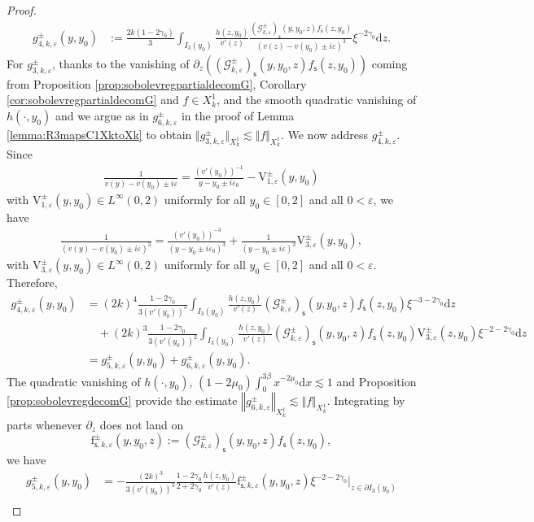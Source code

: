\documentclass[11pt,reqno]{amsproc}
\theoremstyle{definition}
\numberwithin{equation}{section}
\newcommand{\G}{{\mathcal{G}}}
\newcommand{\s}{{\mathsf{s}}}
\renewcommand{\d}{\mathrm{d}}
\newcommand{\ep}{\varepsilon}
\begin{document}
\begin{proof}
\begin{align*}
g_{4,k,\ep}^\pm(y,y_0) &:= \frac{2k(1-2\gamma_0)}{3}\int_{I_3(y_0)} \frac{h(z,y_0)}{v'(z)}  \frac{\left(\G_{k,\ep}^\pm\right)_\s(y,y_0,z)f_\s(z,y_0)}{(v(z) - v(y_0) \pm i\ep)^3}\xi^{-2\gamma_0} \d z.
\end{align*}
For $g_{3,k,\ep}^\pm$, thanks to the vanishing of $\partial_z \left( \left(\G_{k,\ep}^\pm\right)_\s(y,y_0,z)f_\s(z,y_0)\right)$ coming from Proposition \ref{prop:sobolevregpartialdecomG}, Corollary \ref{cor:sobolevregpartialdecomG} and $f\in X_k^1$, and the smooth quadratic vanishing of $h(\cdot,y_0)$ and  we argue as in $g_{6,k,\ep}^\pm$ in the proof of Lemma \ref{lemma:R3mapsC1XktoXk} to obtain $\Vert g_{3,k,\ep}^\pm \Vert_{X_k^1}\lesssim \Vert f \Vert_{X_k^1}$. We now address $g_{4,k,\ep}^\pm$. Since 
\begin{align*}
\frac{1}{v(y) - v(y_0) \pm i\ep} = \frac{(v'(y_0))^{-1}}{y-y_0\pm i\ep_0} -\mathrm{V}_{1,\ep}^\pm(y,y_0)
\end{align*}
with $\mathrm{V}_{1,\ep}^\pm(y,y_0)\in L^\infty(0,2)$ uniformly for all $y_0\in [0,2]$ and all $0<\ep$, we have
\begin{align*}
\frac{1}{(v(y) - v(y_0) \pm i\ep)^3} = \frac{(v'(y_0))^{-3}}{(y-y_0\pm i\ep_0)^3} + \frac{1}{(y-y_0\pm i\ep)^2}\mathrm{V}_{3,\ep}^\pm(y,y_0),
\end{align*}
with $\mathrm{V}_{3,\ep}^\pm(y,y_0)\in L^\infty(0,2)$ uniformly for all $y_0\in [0,2]$ and all $0<\ep$. Therefore,
\begin{align*}
g_{4,k,\ep}^\pm(y,y_0) &= (2k)^4\frac{1-2\gamma_0}{3(v'(y_0))^3}\int_{I_3(y_0)}\frac{h(z,y_0)}{v'(z)} \left(\G_{k,\ep}^\pm\right)_\s(y,y_0,z)f_\s(z,y_0) \xi^{-3-2\gamma_0} \d z \\
&\quad + (2k)^3\frac{1-2\gamma_0}{3(v'(y_0))^2} \int_{I_3(y_0)} \frac{h(z,y_0)}{v'(z)} \left(\G_{k,\ep}^\pm\right)_\s(y,y_0,z)f_\s(z,y_0)\mathrm{V}_{3,\ep}^\pm(z,y_0) \xi^{-2-2\gamma_0} \d z \\
&= g_{5,k,\ep}^\pm(y,y_0) + g_{6,k,\ep}^\pm(y,y_0).
\end{align*}
The quadratic vanishing of $h(\cdot, y_0)$,  $(1-2\mu_0)\int_0^{3\beta}x^{-2\mu_0}\d x \lesssim 1$ and Proposition \ref{prop:sobolevregdecomG} provide the estimate $\left \Vert g_{6,k,\ep}^\pm \right\Vert_{X_k^1}\lesssim \Vert f \Vert_{X_k^1}$. Integrating by parts whenever $\partial_z$ does not land on 
$$\mathrm{f}_{\s,k,\ep}^\pm(y,y_0,z):= \left(\G_{k,\ep}^\pm\right)_\s(y,y_0,z)f_\s(z,y_0),$$ 
we have
\begin{align*}
g_{5,k,\ep}^\pm(y,y_0) &= - \frac{(2k)^3}{3(v'(y_0))^3}\frac{1-2\gamma_0}{2+2\gamma_0} \frac{h(z,y_0)}{v'(z)} \mathrm{f}_{\s,k,\ep}^\pm(y,y_0,z) \xi^{-2-2\gamma_0} \Big|_{z\in \partial I_3(y_0)} \\

\end{align*}
\end{proof}
\end{document}
